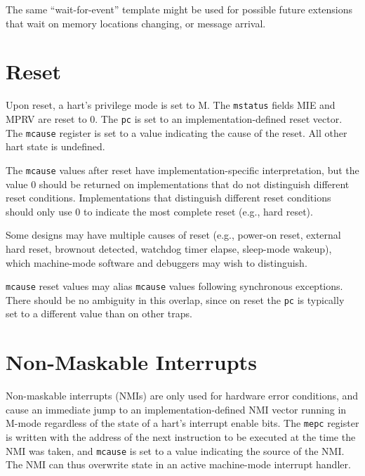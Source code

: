 \begin{commentary}
The same ``wait-for-event'' template might be used for possible future
extensions that wait on memory locations changing, or message
arrival.
\end{commentary}

\section{Reset}
\label{sec:reset}

Upon reset, a hart's privilege mode is set to M.  The {\tt mstatus} fields MIE
and MPRV are reset to 0.  The {\tt pc} is
set to an implementation-defined reset vector.  The {\tt mcause} register is
set to a value indicating the cause of the reset.  All other hart state is
undefined.

The {\tt mcause} values after reset have implementation-specific
interpretation, but the value 0 should be returned on implementations
that do not distinguish different reset conditions. Implementations
that distinguish different reset conditions should only use 0 to
indicate the most complete reset (e.g., hard reset).

\begin{commentary}
Some designs may have multiple causes of reset (e.g., power-on reset,
external hard reset, brownout detected, watchdog timer elapse,
sleep-mode wakeup), which machine-mode software and debuggers may wish
to distinguish.

{\tt mcause} reset values may alias {\tt mcause} values following synchronous
exceptions.  There should be no ambiguity in this overlap, since on reset the
{\tt pc} is typically set to a different value than on other traps.
\end{commentary}

\section{Non-Maskable Interrupts}
\label{sec:nmi}

Non-maskable interrupts (NMIs) are only used for hardware error
conditions, and cause an immediate jump to an implementation-defined
NMI vector running in M-mode regardless of the state of a hart's
interrupt enable bits.  The {\tt mepc} register is written with the
address of the next instruction to be executed at the time the NMI was
taken, and {\tt mcause} is set to a value indicating the source of the
NMI.  The NMI can thus overwrite state in an active machine-mode
interrupt handler.

